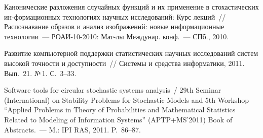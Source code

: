 \begin{multicols}{2}
{{\begin{thebibliography}{99}
 Канонические разложения случайных функций и их применение в стохастических 
 ин-\linebreak формационных технологиях научных исследований: Курс лекций~// 
 Распознавание образов и анализ изоб\-ра\-же\-ний: новые информационные технологии~--- 
 РОАИ-10-2010: Мат-лы Междунар. конф.~--- СПб., 2010.
 
 \vspace*{6pt}

Развитие компьютерной поддержки статистических научных исследований сис\-тем 
высокой точности и доступности~// Системы и средства информатики, 2011. Вып.~21. №\,1. С.~3--33.

 \vspace*{6pt}

\label{end\stat}

Software tools for circular stochastic systems analysis~/ 
29th  Seminar (International) on Stability Problems for  Stochastic Models and
5th Workshop ``Applied Problems in Theory of Probabilities and
Mathematical Statistics Related to Modeling of Information Systems'' (APTP\;+\;MS'2011) Book of
Abstracts.~---  M.: IPI RAS, 2011. P.~86--87.
 \end{thebibliography}
}
}


\end{multicols}       